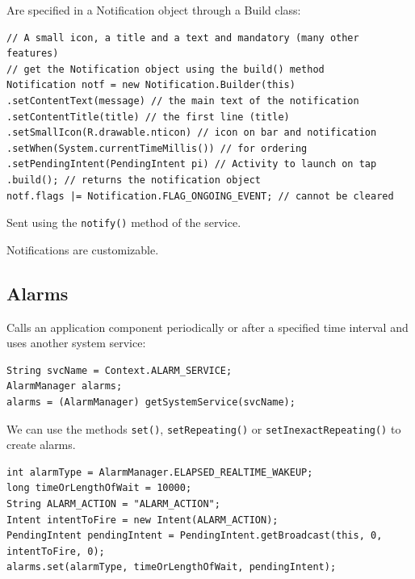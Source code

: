 Are specified in a Notification object through a Build class:
\begin{lstlisting}[title=Build class]
// A small icon, a title and a text and mandatory (many other features)
// get the Notification object using the build() method
Notification notf = new Notification.Builder(this)
.setContentText(message) // the main text of the notification
.setContentTitle(title) // the first line (title)
.setSmallIcon(R.drawable.nticon) // icon on bar and notification
.setWhen(System.currentTimeMillis()) // for ordering
.setPendingIntent(PendingIntent pi) // Activity to launch on tap
.build(); // returns the notification object
notf.flags |= Notification.FLAG_ONGOING_EVENT; // cannot be cleared
\end{lstlisting}

Sent using the \texttt{notify()} method of the service.

Notifications are customizable. 

\subsection{Alarms}

Calls an application component periodically or after a specified time interval and uses another 
system service: 
\begin{lstlisting}[title=Creating an alarm]
String svcName = Context.ALARM_SERVICE;
AlarmManager alarms;
alarms = (AlarmManager) getSystemService(svcName);
\end{lstlisting}

We can use the methods \texttt{set()}, \texttt{setRepeating()} or \texttt{setInexactRepeating()} to create alarms. 

\begin{lstlisting}
int alarmType = AlarmManager.ELAPSED_REALTIME_WAKEUP;
long timeOrLengthOfWait = 10000;
String ALARM_ACTION = "ALARM_ACTION";
Intent intentToFire = new Intent(ALARM_ACTION);
PendingIntent pendingIntent = PendingIntent.getBroadcast(this, 0, intentToFire, 0);
alarms.set(alarmType, timeOrLengthOfWait, pendingIntent);
\end{lstlisting}








